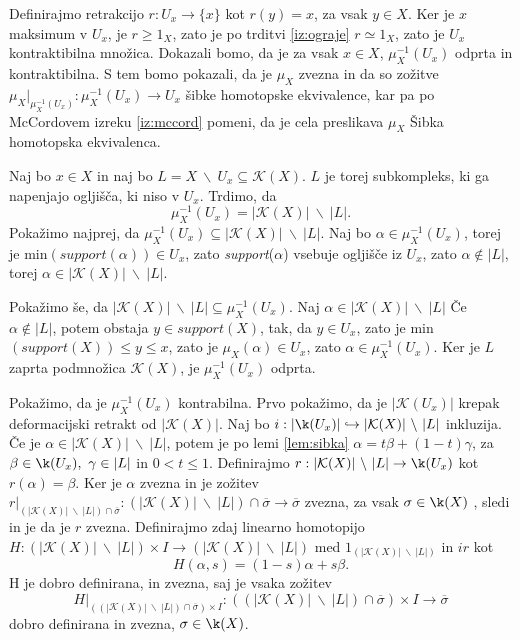 \begin{dokaz}
    Definirajmo retrakcijo $r:U_x\rightarrow \{x\}$ kot 
    $r(y)=x$, za vsak $y\in X$. Ker je $x$ maksimum v 
    $U_x$, je $r\geq 1_X$, zato je po trditvi 
    \ref{iz:ograje} $r\simeq 1_X$, zato je $U_x$ 
    kontraktibilna množica. Dokazali bomo, da je za vsak 
    $x\in X$, $\mu_X^{-1}(U_x)$ odprta in kontraktibilna. S 
    tem bomo pokazali, da je $\mu_X$ zvezna in da so 
    zožitve $\mu_X|_{\mu_X^{-1}(U_x)}:\mu_X^{-1}(U_x)\rightarrow 
    U_x$ šibke homotopske ekvivalence, kar pa po McCordovem izreku \ref*{iz:mccord}
    pomeni, da je cela preslikava $\mu_X$ Šibka homotopska ekvivalenca.

    Naj bo $x\in X$ in naj bo $L=X\ \backslash \
    U_x\subseteq \mathcal{K}(X)$. $L$ je torej 
    subkompleks, ki ga napenjajo ogljišča, ki niso v $U_x$. 
    Trdimo, da 
    $$
    \mu_X^{-1}(U_x)=|\mathcal{K}(X)|\ \backslash \ |L|.
    $$
    Pokažimo najprej, da $\mu_X^{-1}(U_x)\subseteq 
    |\mathcal{K}(X)|\ \backslash \ |L|$. Naj bo $\alpha \in 
    \mu_X^{-1}(U_x)$, torej je min$(\textit{support}
    (\alpha))\in U_x$, zato \textit{support}($\alpha$) vsebuje 
    ogljišče iz $U_x$, zato $\alpha \notin |L|$, torej $\alpha 
    \in |\mathcal{K}(X)|\ \backslash \ |L|$.

    Pokažimo še, da $|\mathcal{K}(X)|\ \backslash \
    |L|\subseteq \mu_X^{-1}(U_x)$. Naj $\alpha \in |\mathcal{K}(X)|\ \backslash \ |L|$
    Če  $\alpha \notin |L|$, potem obstaja $y\in 
    \textit{support}(X)$, tak, da $y \in U_x$, zato je 
    min$(\textit{support}(X))\leq y \leq x$, zato je 
    $\mu_X(\alpha) \in U_x$, zato $\alpha \in \mu_X^{-1}
    (U_x)$.
    Ker je $L$ zaprta podmnožica $\mathcal{K}(X)$, je 
    $\mu_X^{-1}(U_x)$ odprta.

    Pokažimo, da je $\mu_X^{-1}(U_x)$ kontrabilna. Prvo pokažimo, da je 
    $|\mathcal{K}(U_x)|$ krepak deformacijski retrakt 
    od $|\mathcal{K}(X)|$. Naj bo $i:|\k(U_x)|\hookrightarrow |\mathcal{K}
    (X)|\ \backslash \ |L|$ inkluzija. Če je $\alpha \in |\mathcal{K}(X)|\ 
    \backslash \ |L|$, potem je po lemi \ref{lem:sibka}  $\alpha = t\beta + 
    (1-t)\gamma$, za $\beta \in \k(U_x), \ \gamma \in |L|$ in $0<t\leq 1$. 
    Definirajmo $r:|\mathcal{K}(X)|\ \backslash \ |L|\rightarrow \k(U_x)$ 
    kot $r(\alpha)=\beta$. Ker je $\alpha$ zvezna in je zožitev $r|_{(|\mathcal{K}(X)|\ \backslash \ |L|)\cap 
    \overline{\sigma}}:(|\mathcal{K}(X)|\ \backslash \ |L|)\cap 
    \overline{\sigma} \rightarrow \overline{\sigma}$ zvezna, za vsak 
    $\sigma \in \k(X)$ , sledi in je da je $r$ zvezna. Definirajmo zdaj linearno homotopijo $H:(|\mathcal{K}(X)|\ \backslash \ |L|) \times I \rightarrow (|\mathcal{K}(X)|\ \backslash \ |L|)$ med $1_{(|\mathcal{K}(X)|\ \backslash \ |L|)}$ in $ir$ kot 
    $$
    H(\alpha,s)=(1-s)\alpha + s\beta.
    $$
    H je dobro definirana, in zvezna, saj je vsaka zožitev 
    $$
    H|_{((|\mathcal{K}(X)|\ \backslash \ |L|)\cap 
    \overline{\sigma})\times I}:((|\mathcal{K}(X)|\ \backslash \ |L|)\cap 
    \overline{\sigma})\times I \rightarrow \overline{\sigma}
    $$
    dobro definirana in zvezna, $\sigma \in \k(X)$.


\end{dokaz}
